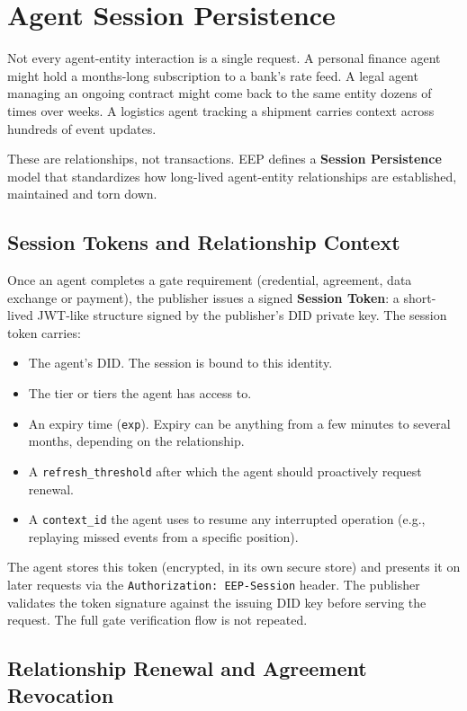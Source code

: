 \documentclass[12pt,a4paper]{article}
\begin{document}
\section{Agent Session Persistence}

Not every agent-entity interaction is a single request. A personal finance agent might hold a months-long subscription to a bank's rate feed. A legal agent managing an ongoing contract might come back to the same entity dozens of times over weeks. A logistics agent tracking a shipment carries context across hundreds of event updates.

These are relationships, not transactions. EEP defines a \textbf{Session Persistence} model that standardizes how long-lived agent-entity relationships are established, maintained and torn down.

\subsection{Session Tokens and Relationship Context}

Once an agent completes a gate requirement (credential, agreement, data exchange or payment), the publisher issues a signed \textbf{Session Token}: a short-lived JWT-like structure signed by the publisher's DID private key. The session token carries:

\begin{itemize}
    \item The agent's DID. The session is bound to this identity.
    \item The tier or tiers the agent has access to.
    \item An expiry time (\texttt{exp}). Expiry can be anything from a few minutes to several months, depending on the relationship.
    \item A \texttt{refresh\_threshold} after which the agent should proactively request renewal.
    \item A \texttt{context\_id} the agent uses to resume any interrupted operation (e.g., replaying missed events from a specific position).
\end{itemize}

The agent stores this token (encrypted, in its own secure store) and presents it on later requests via the \texttt{Authorization: EEP-Session} header. The publisher validates the token signature against the issuing DID key before serving the request. The full gate verification flow is not repeated.

\subsection{Relationship Renewal and Agreement Revocation}
\end{document}
